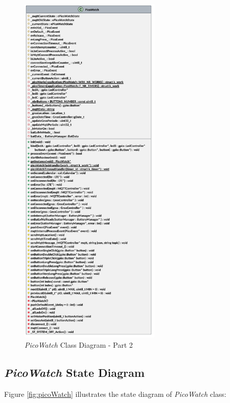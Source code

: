 \documentclass[report.tex]{subfiles}
\begin{document}
\begin{figure}[H]
	\centering
	\includegraphics[width=0.6\textwidth]{Include/Figure/software/class/picowatch_small_1.pdf}
	\caption{\textit{PicoWatch} Class Diagram - Part 2}
	\label{fig:picowatch_small_2}
\end{figure}

\subsection{\textit{PicoWatch} State Diagram}

Figure \ref{fig:picoWatch} illustrates the state diagram of \textit{PicoWatch} class: 
\end{document}
